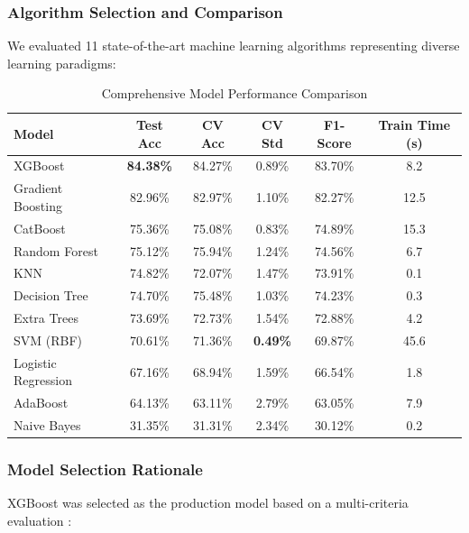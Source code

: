 \documentclass[3p,times,procedia]{elsarticle}
\begin{document}
\subsubsection{Algorithm Selection and Comparison} We evaluated 11 state-of-the-art machine learning algorithms representing diverse learning paradigms:

\begin{table}[h]
\centering
\renewcommand{\arraystretch}{1.2}
\setlength{\tabcolsep}{8pt}

\begin{tabular}{|l|c|c|c|c|c|}
\hline
\rowcolor{gray!20}
\textbf{Model} & \textbf{Test Acc} & \textbf{CV Acc} & \textbf{CV Std} & \textbf{F1-Score} & \textbf{Train Time (s)} \\
\hline
XGBoost & \textbf{84.38\%} & 84.27\% & 0.89\% & 83.70\% & 8.2 \\
\rowcolor{gray!10}
Gradient Boosting & 82.96\% & 82.97\% & 1.10\% & 82.27\% & 12.5 \\
CatBoost & 75.36\% & 75.08\% & 0.83\% & 74.89\% & 15.3 \\
\rowcolor{gray!10}
Random Forest & 75.12\% & 75.94\% & 1.24\% & 74.56\% & 6.7 \\
KNN & 74.82\% & 72.07\% & 1.47\% & 73.91\% & 0.1 \\
\rowcolor{gray!10}
Decision Tree & 74.70\% & 75.48\% & 1.03\% & 74.23\% & 0.3 \\
Extra Trees & 73.69\% & 72.73\% & 1.54\% & 72.88\% & 4.2 \\
\rowcolor{gray!10}
SVM (RBF) & 70.61\% & 71.36\% & \textbf{0.49\%} & 69.87\% & 45.6 \\
Logistic Regression & 67.16\% & 68.94\% & 1.59\% & 66.54\% & 1.8 \\
\rowcolor{gray!10}
AdaBoost & 64.13\% & 63.11\% & 2.79\% & 63.05\% & 7.9 \\
Naive Bayes & 31.35\% & 31.31\% & 2.34\% & 30.12\% & 0.2 \\
\hline
\end{tabular}

\caption{Comprehensive Model Performance Comparison}
\end{table}

\subsubsection{Model Selection Rationale}
\text XGBoost was selected as the production model based on a multi-criteria evaluation \cite{hastie2009statistical}:
\end{document}
